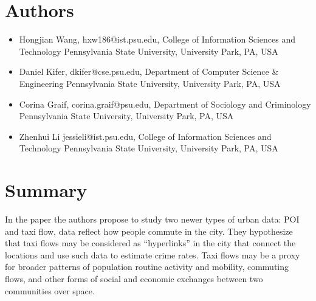 \documentclass[11pt]{article}
\begin{document}
\section*{Authors}
\begin{itemize}

\item Hongjian Wang,
hxw186@ist.psu.edu,
College of Information Sciences and Technology Pennsylvania State University, University Park, PA, USA

\item  Daniel Kifer, 
dkifer@cse.psu.edu,
Department of Computer Science \& Engineering Pennsylvania State University, University Park, PA, USA


\item Corina Graif, 
corina.graif@psu.edu,
Department of Sociology and Criminology Pennsylvania State University, University Park, PA, USA

\item Zhenhui Li
jessieli@ist.psu.edu, 
College of Information Sciences and Technology Pennsylvania State University, University Park, PA, USA

\end{itemize}

\section*{Summary}

In the paper \cite{crimeRate} the authors propose to study two newer types of urban data: POI and taxi flow, data reflect how people commute in the city.  They hypothesize that taxi flows may be considered as “hyperlinks” in the city that connect the locations and use such data to estimate crime rates. Taxi flows may be a proxy for broader patterns of population routine activity and mobility, commuting flows, and other forms of social and economic exchanges between two communities over space. 
\end{document}

